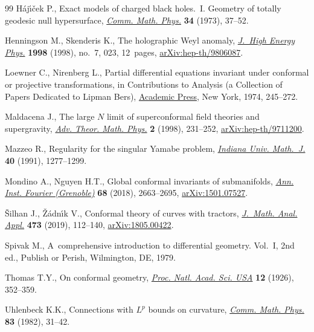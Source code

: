 \documentclass[pdftex]{sigma}
\numberwithin{equation}{section}
\renewcommand{\=}{\stackrel \Lambda =}
\begin{document}
\begin{thebibliography}{99}
H\'aj\'{\i}\v{c}ek P., Exact models of charged black holes.~{I}. {G}eometry of
 totally geodesic null hypersurface, \href{https://doi.org/10.1007/BF01646541}{\textit{Comm. Math. Phys.}} \textbf{34}
 (1973), 37--52.

Henningson M., Skenderis K., The holographic {W}eyl anomaly, \href{https://doi.org/10.1088/1126-6708/1998/07/023}{\textit{J.~High
 Energy Phys.}} \textbf{1998} (1998), no.~7, 023, 12~pages,
 \href{https://arxiv.org/abs/hep-th/9806087}{arXiv:hep-th/9806087}.

Loewner C., Nirenberg L., Partial differential equations invariant under
 conformal or projective transformations, in Contributions to Analysis (a
 Collection of Papers Dedicated to {L}ipman {B}ers), \href{https://doi.org/10.1016/B978-0-12-044850-0.50027-7}{Academic Press}, New York,
 1974, 245--272.

Maldacena J., The large {$N$} limit of superconformal field theories and
 supergravity, \href{https://doi.org/10.4310/ATMP.1998.v2.n2.a1}{\textit{Adv. Theor. Math. Phys.}} \textbf{2} (1998), 231--252,
 \href{https://arxiv.org/abs/hep-th/9711200}{arXiv:hep-th/9711200}.

Mazzeo R., Regularity for the singular {Y}amabe problem, \href{https://doi.org/10.1512/iumj.1991.40.40057}{\textit{Indiana Univ.
 Math.~J.}} \textbf{40} (1991), 1277--1299.

Mondino A., Nguyen H.T., Global conformal invariants of submanifolds,
 \href{https://doi.org/10.5802/aif.3220}{\textit{Ann. Inst. Fourier (Grenoble)}} \textbf{68} (2018), 2663--2695,
 \href{https://arxiv.org/abs/1501.07527}{arXiv:1501.07527}.

{\v{S}}ilhan J., {\v{Z}}\'adn\'{\i}k V., Conformal theory of curves with
 tractors, \href{https://doi.org/10.1016/j.jmaa.2018.12.038}{\textit{J.~Math. Anal. Appl.}} \textbf{473} (2019), 112--140,
 \href{https://arxiv.org/abs/1805.00422}{arXiv:1805.00422}.

Spivak M., A~comprehensive introduction to differential geometry. {V}ol.~{I},
 2nd ed., Publish or Perish, Wilmington, DE, 1979.

Thomas T.Y., On conformal geometry, \href{https://doi.org/10.1073/pnas.12.5.352}{\textit{Proc. Natl. Acad. Sci. USA}}
 \textbf{12} (1926), 352--359.

Uhlenbeck K.K., Connections with {$L^{p}$} bounds on curvature, \href{https://doi.org/10.1007/BF01947069}{ \textit{Comm.
 Math. Phys.}} \textbf{83} (1982), 31--42.


\end{thebibliography}
\end{document}
